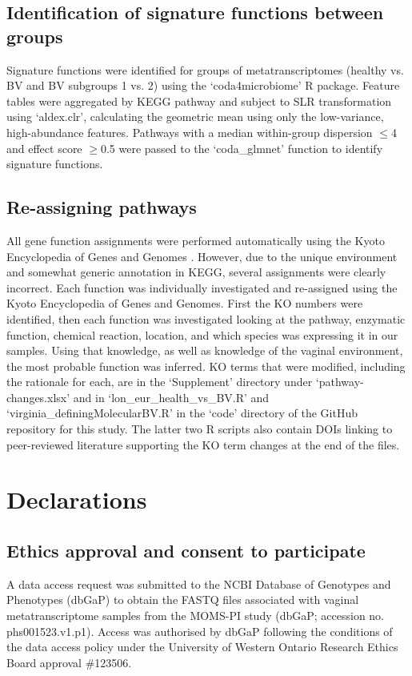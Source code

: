 \documentclass[sn-mathphys,Numbered]{sn-jnl}%
\begin{document}
\subsection{Identification of signature functions between groups} \label{subsec:subsecCoda4Micro}
Signature functions were identified for groups of metatranscriptomes (healthy vs. BV and BV subgroups 1 vs. 2) using the `coda4microbiome' R package. Feature tables were aggregated by KEGG pathway and subject to SLR transformation using `aldex.clr', calculating the geometric mean using only the low-variance, high-abundance features. Pathways with a median within-group dispersion $\leq$4 and effect score $\geq$0.5 were passed to the `coda\_glmnet' function to identify signature functions.

\subsection{Re-assigning pathways}\label{subsec:subsecPathways}
All gene function assignments were performed automatically using the Kyoto Encyclopedia of Genes and Genomes \cite{Kanehisa:2010}. However, due to the unique environment and somewhat generic annotation in KEGG, several assignments were clearly incorrect. Each function was individually investigated and re-assigned using the Kyoto Encyclopedia of Genes and Genomes. First the KO numbers were identified, then each function was investigated looking at the pathway, enzymatic function, chemical reaction, location, and which species was expressing it in our samples. Using that knowledge, as well as knowledge of the vaginal environment, the most probable function was inferred. KO terms that were modified, including the rationale for each, are in the `Supplement' directory under `pathway-changes.xlsx' and in `lon\_eur\_health\_vs\_BV.R' and `virginia\_definingMolecularBV.R' in the `code' directory of the GitHub repository for this study. The latter two R scripts also contain DOIs linking to peer-reviewed literature supporting the KO term changes at the end of the files.

\section{Declarations}\label{sec:secDeclare}

\subsection{Ethics approval and consent to participate}\label{subsec:subsecEthics}
A data access request was submitted to the NCBI Database of Genotypes and Phenotypes (dbGaP) to obtain the FASTQ files associated with vaginal metatranscriptome samples from the MOMS-PI study (dbGaP; accession no. phs001523.v1.p1). Access was authorised by dbGaP following the conditions of the data access policy under the University of Western Ontario Research Ethics Board approval \#123506.
\end{document}
